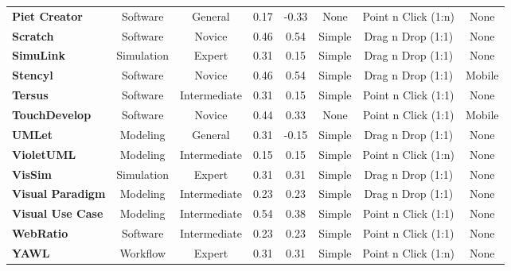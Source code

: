 \begin{table*}
{\begin{tabular}{l|cc|ccccc}
      \textbf{Piet Creator}    & Software	& General	& 0.17	& -0.33	& None	& Point n Click (1:n)	& None			\\[1ex]
      \textbf{Scratch}    & Software	& Novice	& 0.46	& 0.54	& Simple	& Drag n Drop (1:1)	& None			\\[1ex]
      \textbf{SimuLink}    & Simulation	& Expert	& 0.31	& 0.15	& Simple	& Drag n Drop (1:1)	& None			\\[1ex]
      \textbf{Stencyl}    & Software	& Novice	& 0.46	& 0.54	& Simple	& Drag n Drop (1:1)	& Mobile			\\[1ex]
      \textbf{Tersus}    & Software	& Intermediate	& 0.31	& 0.15	& Simple	& Point n Click (1:1)	& None			\\[1ex]
      \textbf{TouchDevelop}    & Software	& Novice	& 0.44	& 0.33	& None	& Point n Click (1:1)	& Mobile			\\[1ex]
      \textbf{UMLet}    & Modeling	& General	& 0.31	& -0.15	& Simple	& Drag n Drop (1:1)	& None			\\[1ex]
      \textbf{VioletUML}    & Modeling	& Intermediate	& 0.15	& 0.15	& Simple	& Point n Click (1:n)	& None			\\[1ex]
      \textbf{VisSim}    & Simulation	& Expert	& 0.31	& 0.31	& Simple	& Drag n Drop (1:1)	& None			\\[1ex]
      \textbf{Visual Paradigm}    & Modeling	& Intermediate	& 0.23	& 0.23	& Simple	& Drag n Drop (1:1)	& None			\\[1ex]
      \textbf{Visual Use Case}    & Modeling	& Intermediate	& 0.54	& 0.38	& Simple	& Point n Click (1:1)	& None			\\[1ex]
      \textbf{WebRatio}    & Software	& Intermediate	& 0.23	& 0.23	& Simple	& Point n Click (1:1)	& None			\\[1ex]
      \textbf{YAWL}    & Workflow	& Expert	& 0.31	& 0.31	& Simple	& Point n Click (1:n)	& None			\\[1ex]
		\end{tabular}}
	\caption{Measure of the human interface of \acp{ide} and their intended audience.}
	\label{tab:interface}
\end{table*}
%
